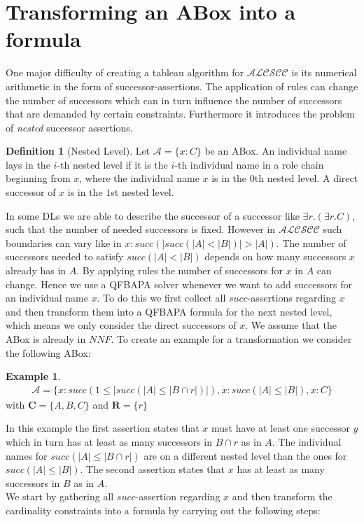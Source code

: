 \documentclass{book}
\theoremstyle{break}
\theoremstyle{definition}
\newtheorem{mydef}{Definition}
\newtheorem{ex}{Example}
\begin{document}
\section{Transforming an ABox into a formula}
One major difficulty of creating a tableau algorithm for $\mathcal{ALCSCC}$ is its numerical arithmetic in the form of successor-assertions. The application of rules can change the number of successors which can in turn influence the number of successors that are demanded by certain constraints. Furthermore it introduces the problem of \textit{nested} successor assertions.
\begin{mydef}[Nested Level]
Let $\mathcal{A}=\{x:C\}$ be an ABox. An individual name lays in the $i$-th nested level if it is the $i$-th individual name in a role chain beginning from $x$, where the individual name $x$ is in the $0$th nested level. A direct successor of $x$ is in the $1$st nested level. 
\end{mydef}
In some DLs we are able to describe the successor of a successor like $\exists r.(\exists r.C)$, such that the number of needed successors is fixed. However in $\mathcal{ALCSCC}$ such boundaries can vary like in $x:succ(|succ(|A|<|B|)|>|A|)$. The number of successors needed to satisfy $succ(|A|<|B|)$ depends on how many successors $x$ already has in $A$. By applying rules the number of successors for $x$ in $A$ can change. Hence we use a QFBAPA solver whenever we want to add successors for an individual name $x$. To do this we first collect all $succ$-assertions regarding $x$ and then transform them into a QFBAPA formula for the next nested level, which means we only consider the direct successors of $x$. We assume that the ABox is already in $NNF$. To create an example for a transformation we consider the following ABox:
\begin{ex}\label{ex1}
\begin{align*}
\mathcal{A}=\{x:succ(1\leq|succ(|A|\leq|B\cap r|)|), x:succ(|A|\leq |B|), x:C\}
\end{align*}
with $\mathbf{C}=\{A,B,C\}$ and $\mathbf{R}=\{r\}$
\end{ex}
In this example the first assertion states that $x$ must have at least one successor $y$ which in turn has at least as many successors in $B\cap r$ as in $A$. The individual names for $succ(|A|\leq|B\cap r|)$ are on a different nested level than the ones for $succ(|A|\leq |B|)$. The second assertion states that $x$ has at least as many successors in $B$ as in $A$.\\
We start by gathering all $succ$-assertion regarding $x$ and then transform the cardinality constraints into a formula by carrying out the following steps:
\end{document}
